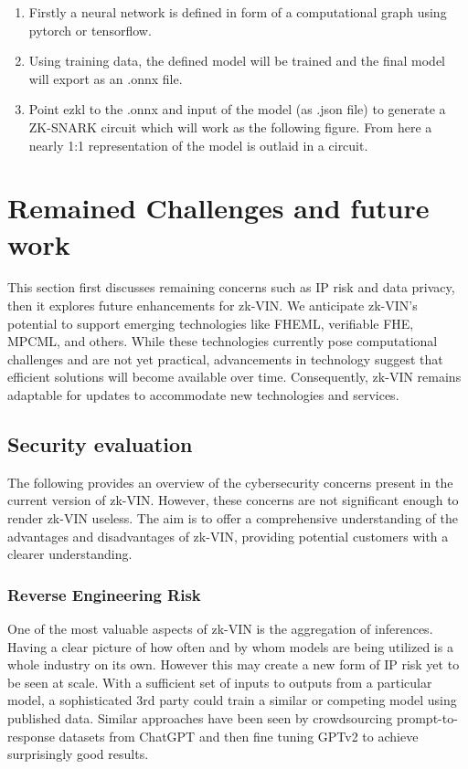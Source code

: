 \documentclass[conference]{IEEEtran}
\begin{document}
\begin{enumerate}
    \item 	Firstly a neural network is defined in form of a computational graph using pytorch or tensorflow.
\item	Using training data, the defined model will be trained and the final model will export as an .onnx file.
\item	Point ezkl to the .onnx and input of the model (as .json file) to generate a ZK-SNARK circuit which will work as the following figure. From here a nearly 1:1 representation of the model is outlaid in a circuit.

\end{enumerate}



\section{Remained Challenges and future work}

This section first discusses remaining concerns such as IP risk and data privacy, then it explores future enhancements for zk-VIN. We anticipate zk-VIN's potential to support emerging technologies like FHEML, verifiable FHE, MPCML, and others. While these technologies currently pose computational challenges and are not yet practical, advancements in technology suggest that efficient solutions will become available over time. Consequently, zk-VIN remains adaptable for updates to accommodate new technologies and services.

\subsection{Security evaluation}

The following provides an overview of the cybersecurity concerns present in the current version of zk-VIN. However, these concerns are not significant enough to render zk-VIN useless. The aim is to offer a comprehensive understanding of the advantages and disadvantages of zk-VIN, providing potential customers with a clearer understanding.

\subsubsection{Reverse Engineering Risk}

One of the most valuable aspects of zk-VIN is the aggregation of inferences. Having a clear picture of how often and by whom models are being utilized is a whole industry on its own. However this may create a new form of IP risk yet to be seen at scale. With a sufficient set of inputs to outputs from a particular model, a sophisticated 3rd party could train a similar or competing model using published data. Similar approaches have been seen by crowdsourcing prompt-to-response datasets from ChatGPT and then fine tuning GPTv2 to achieve surprisingly good results.
\end{document}
